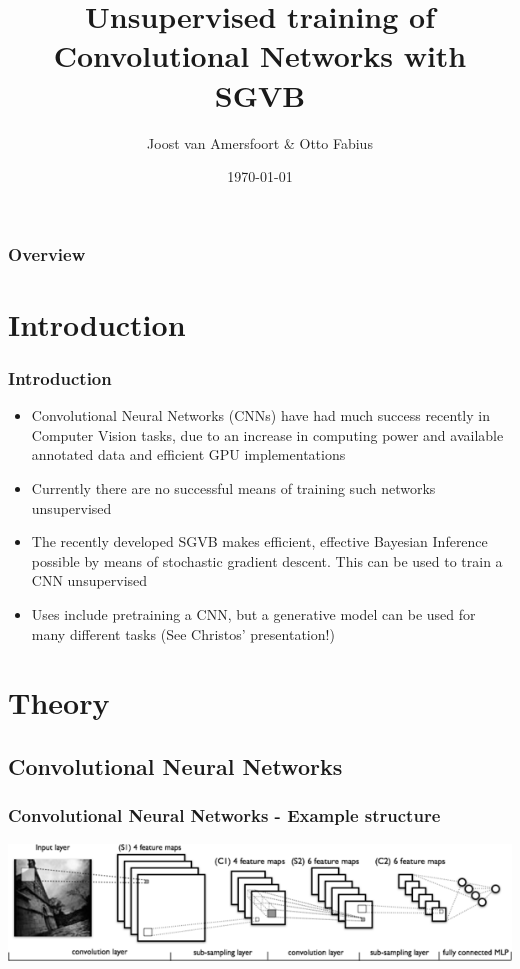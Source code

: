 \documentclass{beamer}
\title[Project Learning Systems]{Unsupervised training of Convolutional Networks with SGVB}
\author{Joost van Amersfoort \& Otto Fabius}
\institute[UvA] 
{University of Amsterdam \\
Supervisor: Diederik Kingma
\medskip
}
\date{\today} %
\begin{document}
\begin{frame}
\titlepage %
\end{frame}

\begin{frame}
\frametitle{Overview}
\tableofcontents 
\end{frame}


\section{Introduction}


\begin{frame}
\frametitle{Introduction}
\begin{itemize}
	\item Convolutional Neural Networks (CNNs) have had much success recently in Computer Vision tasks, due to an increase in computing power and available annotated data and efficient GPU implementations
	\item Currently there are no successful means of training such networks unsupervised
	\item The recently developed SGVB makes efficient, effective Bayesian Inference possible by means of stochastic gradient descent. This can be used to train a CNN unsupervised
	\item Uses include pretraining a CNN, but a generative model can be used for many different tasks (See Christos' presentation!)
\end{itemize}
\end{frame}

\section{Theory}

\subsection{Convolutional Neural Networks}

\begin{frame}
\frametitle{Convolutional Neural Networks - Example structure}

\includegraphics[scale = 0.7]{img/convnet.png} 
\cite{farabet2014}

\end{frame}
\end{document}
